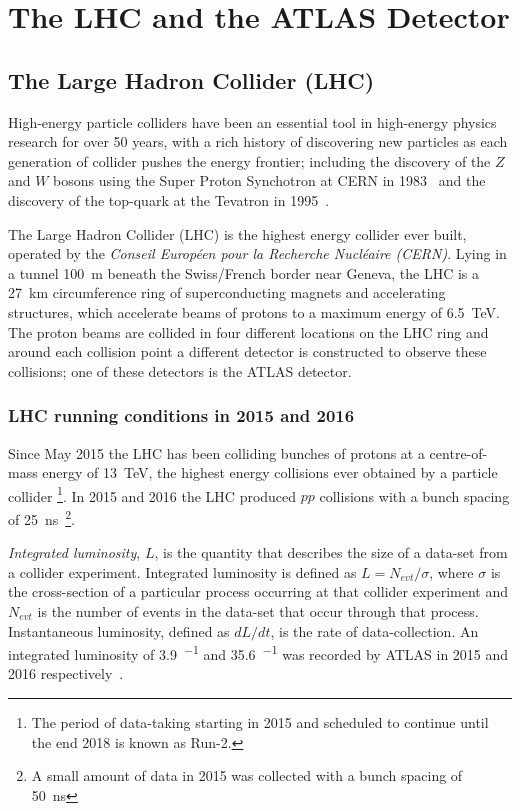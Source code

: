 \chapter{The LHC and the ATLAS Detector}
\label{sec:det}

\section{The Large Hadron Collider (LHC)}
\label{sec:det-LHC}

High-energy particle colliders have been an essential tool in high-energy physics research for over 50 years,
with a rich history of discovering new particles as each generation of collider pushes the energy frontier;
including the discovery of the $Z$ and $W$ bosons using the Super Proton Synchotron at CERN in 1983~\cite{det-Wdisc_UA1, det-Zdisc_UA1, det-Wdisc_UA2, det-Zdisc_UA2} 
and the discovery of the  top-quark at the Tevatron in 1995~\cite{det-tdisc_CDF, det-tdisc_D0}.

The Large Hadron Collider (LHC) is the highest energy collider ever built,
operated by the \textit{Conseil Europ\'een pour la Recherche Nucl\'eaire (CERN)}.
Lying in a tunnel \SI{100}{\metre} beneath the Swiss/French border near Geneva,
the LHC is a \SI{27}{\km} circumference ring of superconducting magnets and accelerating structures,
which accelerate beams of protons to a maximum energy of \SI{6.5}{\TeV}.
The proton beams are collided in four different locations on the LHC ring
and around each collision point a different detector is constructed to observe these collisions;
one of these detectors is the ATLAS detector.

\subsection{LHC running conditions in 2015 and 2016}

Since May 2015 the LHC has been colliding bunches of protons at a centre-of-mass energy of \SI{13}{\TeV},
the highest energy collisions ever obtained by a particle collider
\footnote{The period of data-taking starting in 2015 and scheduled to continue until the end 2018 is known as Run-2.}.
In 2015 and 2016 the LHC produced $pp$ collisions 
with a bunch spacing of \SI{25}{\nano\second}~\footnote{A small amount of data in 2015 was collected with a bunch spacing of \SI{50}{\nano\second}}.

\textit{Integrated luminosity}, $L$, is the quantity that describes the size of a data-set from a collider experiment.
Integrated luminosity is defined as $L = N_{evt}/\sigma$,
where $\sigma$ is the cross-section of a particular process occurring at that collider experiment
and $N_{evt}$ is the number of events in the data-set that occur through that process.
Instantaneous luminosity, defined as $dL/dt$, %
is the rate of data-collection.
An integrated luminosity of \SI{3.9}{\fb^{-1}} and \SI{35.6}{\fb^{-1}} was recorded by ATLAS in 2015 and 2016 respectively~\cite{det-ATLAS_lumi_twiki}.

